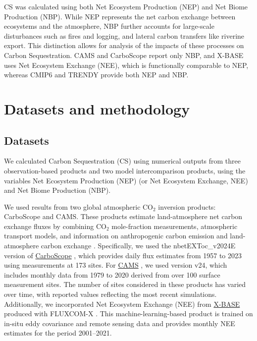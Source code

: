 \documentclass[ProofPDF]{./Styles/Jnls-Template-V3}
\begin{document}
CS was calculated using both Net Ecosystem Production (NEP) and Net Biome Production (NBP). While NEP represents the net carbon exchange between ecosystems and the atmosphere, NBP further accounts for large-scale disturbances such as fires and logging, and lateral carbon transfers like riverine export. This distinction allows for analysis of the impacts of these processes on Carbon Sequestration. CAMS and CarboScope report only NBP, and X-BASE uses Net Ecosystem Exchange (NEE), which is functionally comparable to NEP,  whereas CMIP6 and TRENDY provide both NEP and NBP.

\section{Datasets and methodology}\label{sec:methods}
\subsection{Datasets} 
We calculated Carbon Sequestration (CS) using numerical outputs from three observation-based products and two model intercomparison products, using the variables Net Ecosystem Production (NEP) (or Net Ecosystem Exchange, NEE) and Net Biome Production (NBP).

We used results from two global atmospheric CO$_2$ inversion products: CarboScope and CAMS. These products estimate land-atmosphere net carbon exchange fluxes by combining CO$_2$ mole-fraction measurements, atmospheric transport models, and information on anthropogenic carbon emission and land-atmosphere carbon exchange \citep{Kondo2022}. Specifically, we used the nbetEXToc\_v2024E version of \hyperlink{https://www.bgc-jena.mpg.de/CarboScope/?ID=nbetEXToc_v2024E}{CarboScope} \citep{Rodenbeck2005}, which provides daily flux estimates from 1957 to 2023 using measurements at 173 sites. For \hyperlink{https://ads.atmosphere.copernicus.eu/datasets/cams-global-greenhouse-gas-inversion?tab=overview}{CAMS} \citep{Chevallier2013}, we used version v24, which includes monthly data from 1979 to 2020 derived from over 100 surface measurement sites. The number of sites considered in these products has varied over time, with reported values reflecting the most recent simulations. Additionally, we incorporated Net Ecosystem Exchange (NEE) from \hyperlink{https://meta.icos-cp.eu/collections/zfwf1Ak2I7OlziGDTX8Xl6_T}{X-BASE} produced with FLUXCOM-X \citep{Nelson2024}. This machine-learning-based product is trained on in-situ eddy covariance and remote sensing data and provides monthly NEE estimates for the period 2001–2021.
\end{document}
